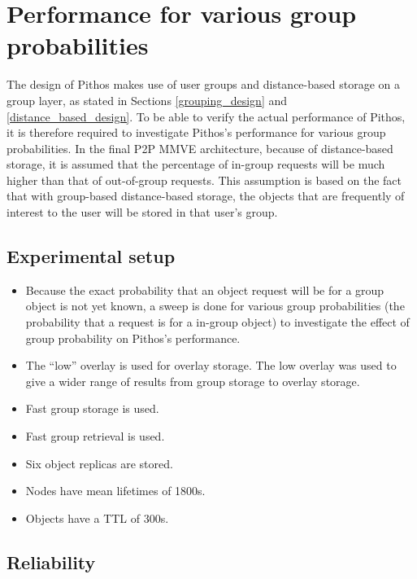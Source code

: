 \section{Performance for various group probabilities}
\label{group_probability_results}

The design of Pithos makes use of user groups and distance-based storage on a group layer, as stated in Sections \ref{grouping_design} and \ref{distance_based_design}. To be able to verify the actual performance of Pithos, it is therefore required to investigate Pithos's performance for various group probabilities. In the final P2P MMVE architecture, because of distance-based storage, it is assumed that the percentage of in-group requests will be much higher than that of out-of-group requests. This assumption is based on the fact that with group-based distance-based storage, the objects that are frequently of interest to the user will be stored in that user's group.

\subsection{Experimental setup}

\begin{itemize}
\item Because the exact probability that an object request will be for a group object is not yet known, a sweep is done for various group probabilities (the probability that a request is for a in-group object) to investigate the effect of group probability on Pithos's performance.

\item The ``low'' overlay is used for overlay storage. The low overlay was used to give a wider range of results from group storage to overlay storage.

 \item Fast  group storage is used.

 \item Fast group retrieval is used.

 \item Six object replicas are stored.

 \item Nodes have mean lifetimes of 1800s.

 \item Objects have a TTL of 300s.
\end{itemize}

\subsection{Reliability}

